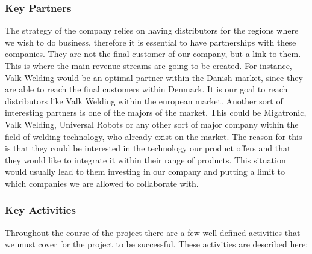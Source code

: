 \subsubsection{Key Partners}
The strategy of the company relies on having distributors for the regions where we wish to do business, therefore it is essential to have partnerships with these companies. They are not the final customer of our company, but a link to them. This is where the main revenue streams are going to be created.
For instance, Valk Welding would be an optimal partner within the Danish market, since they are able to reach the final customers within Denmark. It is our goal to reach distributors like Valk Welding within the european market.
Another sort of interesting partners is one of the majors of the market. This could be Migatronic, Valk Welding, Universal Robots or any other sort of major company within the field of welding technology, who already exist on the market. The reason for this is that they could be interested in the technology our product offers and that they would like to integrate it within their range of products. This situation would usually lead to them investing in our company and putting a limit to which companies we are allowed to collaborate with.

\subsubsection{Key Activities}
Throughout the course of the project there are a few well defined activities that we must cover for the project to be successful. These activities are described here:

